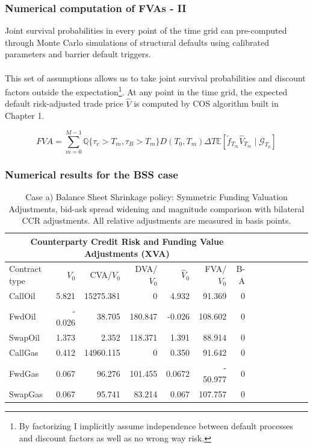 \documentclass{beamer}
\begin{document}
\begin{frame}
\frametitle{Numerical computation of FVAs - II}
	Joint survival probabilities in every point of the time grid can pre-computed through Monte Carlo simulations of structural defaults using calibrated parameters and barrier default triggers.\\~\\
 
	 This set of assumptions allows us to take joint survival probabilities and discount factors outside the expectation\footnote{By factorizing I implicitly assume independence between default processes and discount factors as well as no wrong way risk.}. At any point in the time grid, the expected default risk-adjusted trade price $\hat{V}$ is computed by COS algorithm built in Chapter 1.

	\begin{equation}
		FVA = \sum_{m = 0}^{M-1}  \mathbb{Q}\{ \tau_c > T_m, \tau_B>T_m\} D(T_0, T_m) \Delta T  \mathbb{E} [ \tilde{f}_{T_m} \hat{V}_{T_m} \mid \mathcal{G}_{T_0}]
	\end{equation}

\end{frame}

\begin{frame}
\frametitle{Numerical results for the BSS case}
	\begin{table} [htbp]
	\centering
	\begin{tabular}{ |p{1.3  cm}| r|r|r|r|r|r|p{1 cm}|r| p{1 cm}| p{1 cm}| 
	p{1 cm}| p{1.3 cm}| p{0.7 cm} |} 

	\hline
	\multicolumn{7}{|c|}{\textbf{Counterparty Credit Risk and Funding
  	Value Adjustments (XVA) }} \\
 	\hline
	Contract type & $V_{0}$  &CVA/$V_{0}$ & DVA/$V_{0}$ &$\hat{V}_0$ &FVA/${V}_0$ & B-A\\
 	\hline

	CallOil &5.821  &15275.381 &0  &4.932 & 91.369 &0\\
	FwdOil &- 0.026  &38.705 &180.847 &-0.026 & 108.602 &0\\
	SwapOil &1.373  &2.352  &118.371 &1.391 &88.914 &0\\
	CallGas &0.412  &14960.115 &0 &0.350 &91.642 & 0\\
	FwdGas &0.067  &96.276  &101.455& 0.0672 & - 50.977 &0\\
	SwapGas &0.067  &95.741  &83.214 & 0.067 & 107.757 &0\\
  	\hline
	\end{tabular}
	\caption{Case a) Balance Sheet Shrinkage policy: Symmetric Funding Valuation Adjustments, bid-ask spread widening and magnitude comparison with bilateral CCR adjustments. All relative adjustments are measured in basis points.}

	\end{table}
\end{frame}
\end{document}
